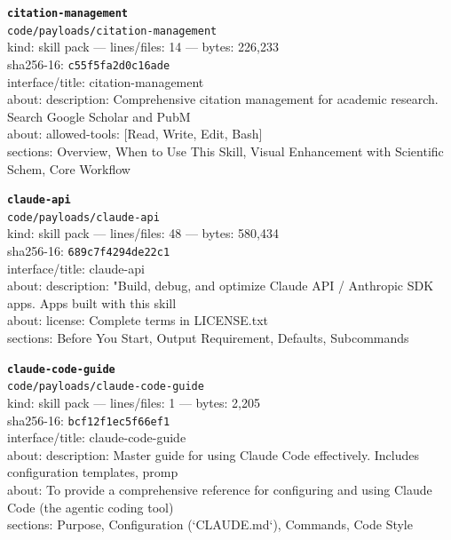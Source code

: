 \noindent\textbf{\texttt{citation-management}}\\
\texttt{code/payloads/citation-management}\\
kind: skill pack --- lines/files: 14 --- bytes: 226,233\\
sha256-16: \texttt{c55f5fa2d0c16ade}\\
interface/title: citation-management\\
about: description: Comprehensive citation management for academic research. Search Google Scholar and PubM\\
about: allowed-tools: [Read, Write, Edit, Bash]\\
sections: Overview, When to Use This Skill, Visual Enhancement with Scientific Schem, Core Workflow\\
\vspace*{6.0pt}
\newpage

\noindent\textbf{\texttt{claude-api}}\\
\texttt{code/payloads/claude-api}\\
kind: skill pack --- lines/files: 48 --- bytes: 580,434\\
sha256-16: \texttt{689c7f4294de22c1}\\
interface/title: claude-api\\
about: description: "Build, debug, and optimize Claude API / Anthropic SDK apps. Apps built with this skill\\
about: license: Complete terms in LICENSE.txt\\
sections: Before You Start, Output Requirement, Defaults, Subcommands\\
\vspace*{6.0pt}

\noindent\textbf{\texttt{claude-code-guide}}\\
\texttt{code/payloads/claude-code-guide}\\
kind: skill pack --- lines/files: 1 --- bytes: 2,205\\
sha256-16: \texttt{bcf12f1ec5f66ef1}\\
interface/title: claude-code-guide\\
about: description: Master guide for using Claude Code effectively. Includes configuration templates, promp\\
about: To provide a comprehensive reference for configuring and using Claude Code (the agentic coding tool)\\
sections: Purpose, Configuration (`CLAUDE.md`), Commands, Code Style\\
\vspace*{6.0pt}

